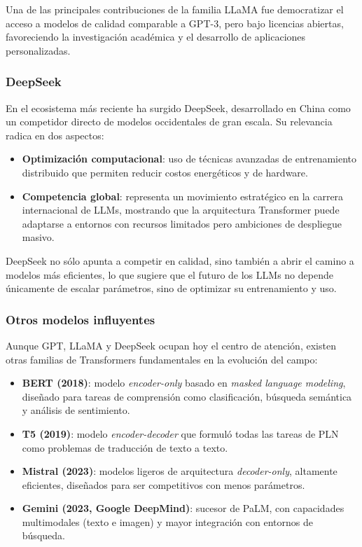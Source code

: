 Una de las principales contribuciones de la familia LLaMA fue democratizar el acceso a modelos de calidad comparable a GPT-3, pero bajo licencias abiertas, favoreciendo la investigaci\'on acad\'emica y el desarrollo de aplicaciones personalizadas.

\subsubsection{DeepSeek}

En el ecosistema m\'as reciente ha surgido DeepSeek, desarrollado en China como un competidor directo de modelos occidentales de gran escala. Su relevancia radica en dos aspectos:

\begin{itemize}
    \item \textbf{Optimizaci\'on computacional}: uso de t\'ecnicas avanzadas de entrenamiento distribuido que permiten reducir costos energ\'eticos y de hardware.
    \item \textbf{Competencia global}: representa un movimiento estrat\'egico en la carrera internacional de LLMs, mostrando que la arquitectura Transformer puede adaptarse a entornos con recursos limitados pero ambiciones de despliegue masivo.
\end{itemize}

DeepSeek no s\'olo apunta a competir en calidad, sino tambi\'en a abrir el camino a modelos m\'as eficientes, lo que sugiere que el futuro de los LLMs no depende \'unicamente de escalar par\'ametros, sino de optimizar su entrenamiento y uso.

\subsubsection{Otros modelos influyentes}

Aunque GPT, LLaMA y DeepSeek ocupan hoy el centro de atenci\'on, existen otras familias de Transformers fundamentales en la evoluci\'on del campo:

\begin{itemize}
    \item \textbf{BERT (2018)}: modelo \textit{encoder-only} basado en \textit{masked language modeling}, dise\~nado para tareas de comprensi\'on como clasificaci\'on, b\'usqueda sem\'antica y an\'alisis de sentimiento.
    \item \textbf{T5 (2019)}: modelo \textit{encoder-decoder} que formul\'o todas las tareas de PLN como problemas de traducci\'on de texto a texto.
    \item \textbf{Mistral (2023)}: modelos ligeros de arquitectura \textit{decoder-only}, altamente eficientes, dise\~nados para ser competitivos con menos par\'ametros.
    \item \textbf{Gemini (2023, Google DeepMind)}: sucesor de PaLM, con capacidades multimodales (texto e imagen) y mayor integraci\'on con entornos de b\'usqueda.
\end{itemize}